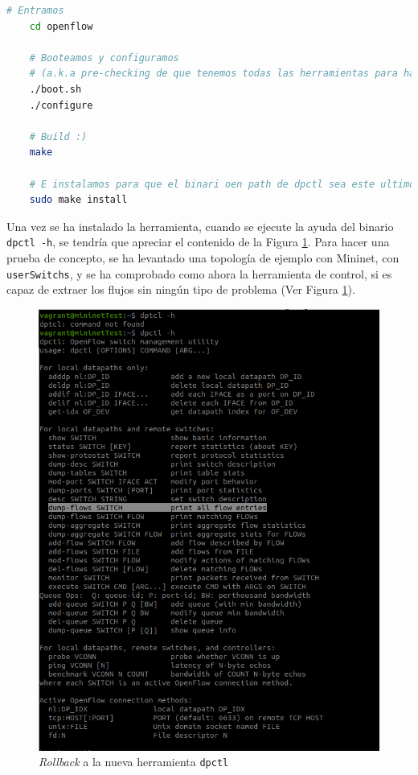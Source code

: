 \begin{lstlisting}[language= bash, style=Consola, caption={Construcción de la nueva versión de dpctl},label=code:dpctlold2]
    # Entramos
    cd openflow

    # Booteamos y configuramos 
    # (a.k.a pre-checking de que tenemos todas las herramientas para hacer el make)
    ./boot.sh
    ./configure

    # Build :)
    make

    # E instalamos para que el binari oen path de dpctl sea este ultimo
    sudo make install
\end{lstlisting}
\vspace{0.5cm}


Una vez se ha instalado la herramienta, cuando se ejecute la ayuda del binario \texttt{dpctl -h}, se tendría que apreciar el contenido de la Figura \ref{fig:dpctl_5}. Para hacer una prueba de concepto, se ha levantado una topología de ejemplo con Mininet, con \texttt{userSwitchs}, y se ha comprobado como ahora la herramienta de control, si es capaz de extraer los flujos sin ningún tipo de problema (Ver Figura \ref{fig:dpctl_5}).

\begin{figure}[ht]
    \centering
    \includegraphics[width=\textwidth]{archivos/img/dev/dpctl_5.png}
    \caption{\textit{Rollback} a la nueva herramienta \texttt{dpctl}}
    \label{fig:dpctl_5}
\end{figure}

